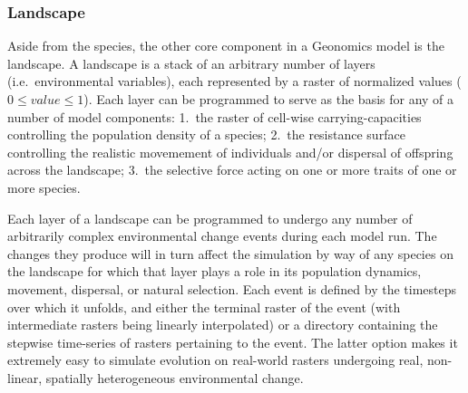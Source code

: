 ﻿\documentclass{article}
\begin{document}
\subsubsection{Landscape}
Aside from the species, the other core component in a Geonomics model is the landscape.
A landscape is a stack of an arbitrary number of layers (i.e.\ environmental variables),
each represented by a raster of normalized values ($0 \leq value \leq 1$).
Each layer can be programmed to serve as the basis for any of a number of model components:
1.\ the raster of cell-wise carrying-capacities controlling the population density of a species;
2.\ the resistance surface controlling the realistic movemement of individuals and/or 
dispersal of offspring across the landscape;
3.\ the selective force acting on one or more traits  of one or more species.

Each layer of a landscape can be programmed to undergo any number of
arbitrarily complex environmental change events during each model run.
The changes they produce will in turn affect the simulation by way
of any species on the landscape for which that layer plays a role in its
population dynamics, movement, dispersal, or natural selection.
Each event is defined by the timesteps over which it unfolds, and either the terminal
raster of the event (with intermediate rasters being linearly interpolated) 
or a directory containing the stepwise time-series of rasters pertaining to the event.
The latter option makes it extremely easy to simulate evolution on real-world
rasters undergoing real, non-linear, spatially heterogeneous environmental change.
\end{document}
